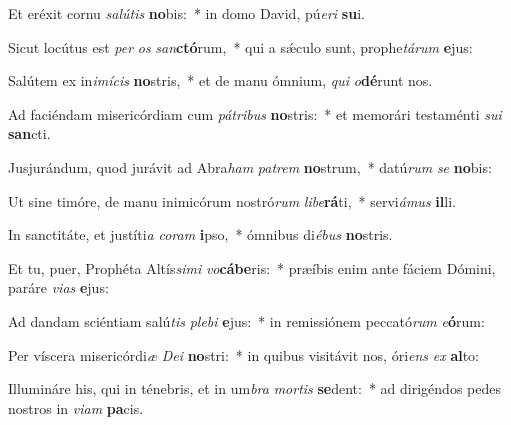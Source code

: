 \item Et eréxit cornu \textit{salútis} \textbf{no}bis:~* in domo David, pú\tinyhspace\textit{eri} \textbf{su}i.
\item Sicut locútus est \textit{per} \textit{os} \textit{san}\textbf{ctó}rum,~* qui a sǽculo sunt, prophe\tinyhspace\textit{tárum} \textbf{e}jus:
\item Salútem ex in\textit{imícis} \textbf{no}stris,~* et de manu ómnium, \textit{qui} \textit{o}\textbf{dé}runt nos.
\item Ad faciéndam misericórdiam cum \textit{pátribus} \textbf{no}stris:~* et memorári testaménti \textit{sui} \textbf{san}cti.
\item Jusjurándum, quod jurávit ad Abra\textit{ham} \textit{patrem} \textbf{no}strum,~* datú\tinyhspace\textit{rum} \textit{se} \textbf{no}bis:
\item Ut sine timóre, de manu inimicórum nostró\textit{rum} \textit{libe}\textbf{rá}ti,~* servi\tinyhspace\textit{ámus} \textbf{il}li.
\item In sanctitáte, et justíti\tinyhspace\textit{a} \textit{coram} \textbf{i}pso,~* ómnibus di\tinyhspace\textit{ébus} \textbf{no}stris.
\item Et tu, puer, Prophéta Altís\tinyhspace\textit{simi} \textit{vo}\textbf{cá}\textbf{be}ris:~* præíbis enim ante fáciem Dómini, paráre \textit{vias} \textbf{e}jus:
\item Ad dandam sciéntiam salú\tinyhspace\textit{tis} \textit{plebi} \textbf{e}jus:~* in remissiónem peccató\textit{rum} \textit{e}\textbf{ó}rum:
\item Per víscera misericórdi\tinyhspace\textit{æ} \textit{Dei} \textbf{no}stri:~* in quibus visitávit nos, óri\tinyhspace\textit{ens} \textit{ex} \textbf{al}to:
\item Illumináre his, qui in ténebris, et in um\textit{bra} \textit{mortis} \textbf{se}dent:~* ad dirigéndos pedes nostros in \textit{viam} \textbf{pa}cis.
